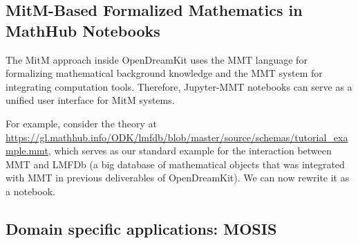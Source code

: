 \subsection{MitM-Based Formalized Mathematics in MathHub Notebooks}

The MitM approach inside OpenDreamKit uses the MMT language for formalizing mathematical background knowledge and the MMT system for integrating computation tools.
Therefore, Jupyter-MMT notebooks can serve as a unified user interface for MitM systems.

For example, consider the theory at \url{https://gl.mathhub.info/ODK/lmfdb/blob/master/source/schemas/tutorial_example.mmt}, which serves as our standard example for the interaction between MMT and LMFDb (a big database of mathematical objects that was integrated with MMT in previous deliverables of OpenDreamKit).
We can now rewrite it as a notebook.

\subsection{Domain specific applications: MOSIS}



